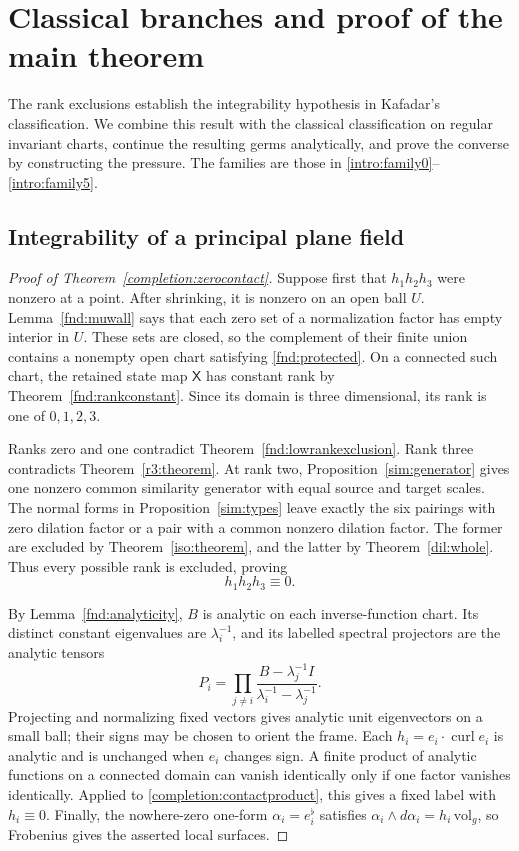 \documentclass[11pt,a4paper]{article}
\numberwithin{equation}{section}
\theoremstyle{plain}
\theoremstyle{definition}
\theoremstyle{remark}
\begin{document}
\section{Classical branches and proof of the main theorem}\label{sec:completion}

The rank exclusions establish the integrability hypothesis in Kafadar's
classification. We combine this result with the classical classification
on regular invariant charts, continue the resulting germs analytically,
and prove the converse by constructing the pressure. The families are
those in \eqref{intro:family0}--\eqref{intro:family5}.

\subsection{Integrability of a principal plane field}

\begin{proof}[Proof of Theorem~\ref{completion:zerocontact}]
Suppose first that $h_1h_2h_3$ were nonzero at a point. After shrinking,
it is nonzero on an open ball $U$. Lemma~\ref{fnd:muwall} says that
each zero set of a normalization factor has empty interior in $U$. These
sets are closed, so the complement of their finite union contains a
nonempty open chart satisfying \eqref{fnd:protected}. On a connected such chart, the retained
state map $\mathsf X$ has constant rank by Theorem~\ref{fnd:rankconstant}.
Since its domain is three dimensional, its rank is one of $0,1,2,3$.

Ranks zero and one contradict Theorem~\ref{fnd:lowrankexclusion}.
Rank three contradicts Theorem~\ref{r3:theorem}. At rank two,
Proposition~\ref{sim:generator} gives one nonzero common similarity
generator with equal source and target scales. The normal forms in
Proposition~\ref{sim:types} leave exactly the six pairings with zero dilation factor
or a pair with a common nonzero dilation factor. The former are excluded by
Theorem~\ref{iso:theorem}, and the latter by
Theorem~\ref{dil:whole}. Thus every possible rank is excluded, proving
\begin{equation}\label{completion:contactproduct}
 h_1h_2h_3\equiv0.
\end{equation}

By Lemma~\ref{fnd:analyticity}, $B$ is analytic on each inverse-function
chart. Its distinct constant eigenvalues are $\lambda_i^{-1}$, and its labelled
spectral projectors are the analytic tensors
\[
 P_i=\prod_{j\ne i}\frac{B-\lambda_j^{-1}I}{\lambda_i^{-1}-\lambda_j^{-1}}.
\]
Projecting and normalizing fixed vectors gives analytic unit
eigenvectors on a small ball; their signs may be chosen to orient the
frame. Each $h_i=e_i\cdot\operatorname{curl}e_i$ is analytic and is
unchanged when $e_i$ changes sign. A finite product of analytic
functions on a connected domain can vanish identically only if one
factor vanishes identically. Applied to
\eqref{completion:contactproduct}, this gives a fixed label with
$h_i\equiv0$. Finally, the nowhere-zero one-form $\alpha_i=e_i^\flat$
satisfies $\alpha_i\wedge d\alpha_i=h_i\,\mathrm{vol}_g$, so Frobenius
gives the asserted local surfaces.
\end{proof}
\end{document}
